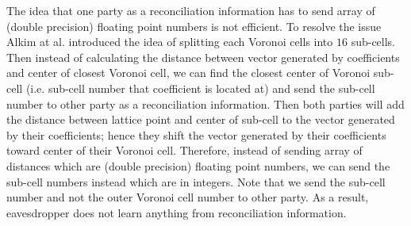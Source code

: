 The idea that one party as a reconciliation information has to send array of (double precision) floating point numbers is not efficient. To resolve the issue Alkim at al. introduced the idea of splitting each Voronoi cells into \iftoggle{verylong}{$2^{rd}=$}{}$16$ sub-cells. Then instead of calculating the distance between vector generated by coefficients and center of closest Voronoi cell, we can find the closest center of Voronoi sub-cell (i.e. sub-cell number that coefficient is located at) and send the sub-cell number to other party as a reconciliation information. Then both parties will add the distance between  lattice point and center of sub-cell to the vector generated by their coefficients; hence they shift the vector generated by their coefficients toward center of their Voronoi cell. Therefore, instead of sending array of distances which are (double precision) floating point numbers, we can send the sub-cell numbers instead which are in integers. Note that we send the sub-cell number and not the outer Voronoi cell number to other party. As a result, eavesdropper does not learn anything from reconciliation information.








